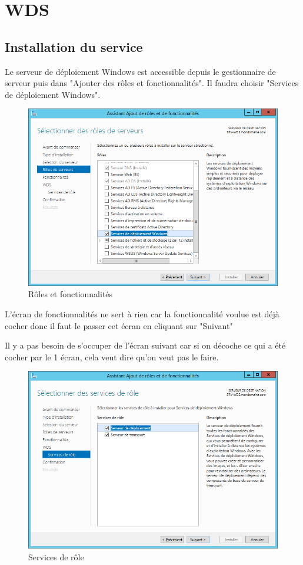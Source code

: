 \documentclass[11pt,a4paper,oneside]{article}
\begin{document}
\section{WDS}
\subsection{Installation du service}
Le serveur de déploiement Windows est accessible depuis le gestionnaire de serveur puis dans "Ajouter des rôles et fonctionnalités". Il faudra choisir "Services de déploiement Windows".\\
\begin{figure}[hbtp]
\centering
\includegraphics[scale=0.7]{Pictures/Installation/InstallWDS.png}
\caption{\label{etiquette} Rôles et fonctionnalités}
\end{figure}

L'écran de fonctionnalités ne sert à rien car la fonctionnalité voulue est déjà cocher donc il faut le passer cet écran en cliquant sur "Suivant"
\newpage

Il y a pas besoin de s'occuper de l'écran suivant car si on décoche ce qui a été cocher par le 1\ier{} écran, cela veut dire qu'on veut pas le faire.
\begin{figure}[hbtp]
\centering
\includegraphics[scale=0.7]{Pictures/Installation/InstallRole.png}
\caption{\label{etiquette} Services de rôle}
\end{figure}
\end{document}
